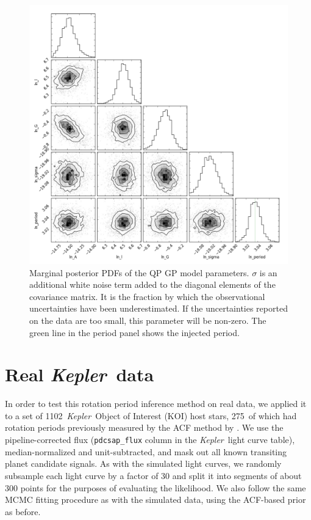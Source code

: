 \documentclass[useAMS, usenatbib, preprint, 12pt]{aastex}
\newcommand{\nkois}{1102}
\newcommand{\nkoimcq}{275}
\newcommand{\Kepler}{{\it Kepler}}
\newcommand{\kepler}{\Kepler}
\begin{document}
\begin{figure}
\begin{center}
\includegraphics[width=6in, clip=true]{figures/25.png}
\caption{Marginal posterior PDFs of the QP GP model parameters. $\sigma$ is an
additional white noise term added to the diagonal elements of the covariance
matrix. It is the fraction by which the observational uncertainties have been
underestimated. If the uncertainties reported on the data are too small, this
parameter will be non-zero.
    The green line in the period panel shows the injected period.}
\label{fig:gp_posteriors}
\end{center}
\end{figure}

\section{Real \kepler\ data}
\label{sec:kepler}

In order to test this rotation period inference method on real data,
we applied it to a set of \nkois\ \Kepler\ Object of Interest (KOI)
host stars, \nkoimcq\ of which had rotation periods previously measured by
the ACF method by \citet{Mcquillan2013}.  We use the pipeline-corrected flux
(\texttt{pdcsap\_flux} column in the \Kepler\ light curve table), median-normalized
and unit-subtracted, and mask out all known transiting planet candidate signals.
As with the simulated light curves, we randomly subsample each
light curve by a factor of 30 and split it into segments of about 300 points
for the purposes of evaluating the likelihood.  We also follow the same MCMC
fitting procedure as with the simulated data, using the ACF-based prior as before.
\end{document}
